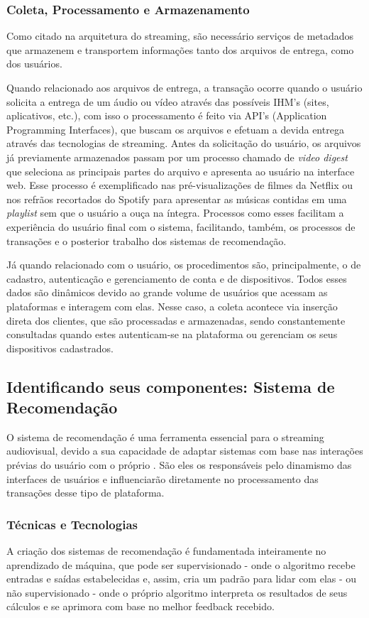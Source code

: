\documentclass[conference]{IEEEtran}
\begin{document}
\subsubsection{Coleta, Processamento e Armazenamento}
Como citado na arquitetura do streaming, são necessário serviços de metadados que armazenem e transportem informações tanto dos arquivos de entrega, como dos usuários.

Quando relacionado aos arquivos de entrega, a transação ocorre quando o usuário solicita a entrega de um áudio ou vídeo através das possíveis IHM's (sites, aplicativos, etc.), com isso o processamento é feito via API's (Application Programming Interfaces), que buscam os arquivos e efetuam a devida entrega através das tecnologias de streaming. Antes da solicitação do usuário, os arquivos já previamente armazenados passam por um processo chamado de \textit{video digest} que seleciona as principais partes do arquivo e apresenta ao usuário na interface web. Esse processo é exemplificado nas pré-visualizações de filmes da Netflix ou nos refrãos recortados do Spotify para apresentar as músicas contidas em uma \textit{playlist} sem que o usuário a ouça na íntegra. Processos como esses facilitam a experiência do usuário final com o sistema, facilitando, também, os processos de transações e o posterior trabalho dos sistemas de recomendação.

Já quando relacionado com o usuário, os procedimentos são, principalmente, o de cadastro, autenticação e gerenciamento de conta e de dispositivos. Todos esses dados são dinâmicos devido ao grande volume de usuários que acessam as plataformas e interagem com elas. Nesse caso, a coleta acontece via inserção direta dos clientes, que são processadas e armazenadas, sendo constantemente consultadas quando estes autenticam-se na plataforma ou gerenciam os seus dispositivos cadastrados.


\subsection{Identificando seus componentes: Sistema de Recomendação}
O sistema de recomendação é uma ferramenta essencial para o streaming audiovisual, devido a sua capacidade de adaptar sistemas com base nas interações prévias do usuário com o próprio \cite{b6}. São eles os responsáveis pelo dinamismo das interfaces de usuários e influenciarão diretamente no processamento das transações desse tipo de plataforma.
\subsubsection{Técnicas e Tecnologias}
A criação dos sistemas de recomendação é fundamentada inteiramente no aprendizado de máquina, que pode ser supervisionado - onde o algoritmo recebe entradas e saídas estabelecidas e, assim, cria um padrão para lidar com elas - ou não supervisionado - onde o próprio algoritmo interpreta os resultados de seus cálculos e se aprimora com base no melhor feedback recebido.
\end{document}

